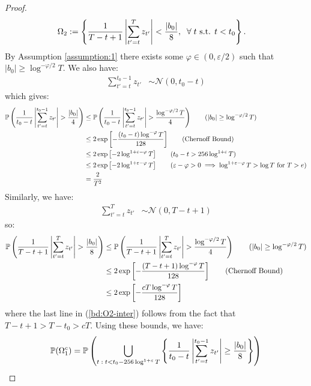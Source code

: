 \begin{proof}
\begin{align*}
    \Omega_2 &:= \left\{\frac{1}{T-t+1}\left|\sum_{t'=t}^T z_{t'}\right| < \frac{|b_0|}{8}, \; \;\forall\; t \text{ s.t. } t < t_0 \right\}.
\end{align*}
By Assumption \ref{assumption:1} there exists some $\varphi \in (0,\varepsilon/2)$ such that $|b_0| \geq \log^{-\varphi/2}T$. We also have:
\begin{align*}
    \sum_{t'=t}^{t_0-1} z_{t'} &\sim \mathcal{N}(0, t_0 - t) 
\end{align*}
which gives:
\begin{align}
    \mathbb{P}\left(\frac{1}{t_0-t}\left|\sum_{t'=t}^{t_0-1} z_{t'}\right| > \frac{|b_0|}{4}\right) &\leq \mathbb{P}\left(\frac{1}{t_0-t}\left|\sum_{t'=t}^{t_0-1} z_{t'}\right| > \frac{\log^{-\varphi/2}T}{4}\right) \tag{$|b_0| \geq \log^{-\varphi/2}T$} \\
    &\leq 2 \exp\left[- \frac{(t_0-t)\log^{-\varphi}T}{128}\right] \tag{Chernoff Bound}\\
    &\leq 2 \exp\left[- 2\log^{1+\varepsilon-\varphi}T\right] \tag{$t_0 - t > 256\log^{1+\varepsilon} T$} \\
    &\leq 2 \exp\left[- 2\log^{1+\varepsilon-\varphi}T\right] \tag{$\varepsilon-\varphi > 0 \implies \log^{1+\varepsilon-\varphi}T > \log T$ for $T > e$}\\ 
    &= \frac{2}{T^2} \label{bd:O1-inter} 
\end{align}
Similarly, we have:
\begin{align*}
    \sum_{t'=t}^{T} z_{t'} &\sim \mathcal{N}(0, T - t + 1)
\end{align*}
so:
\begin{align}
    \mathbb{P}\left(\frac{1}{T-t+1}\left|\sum_{t'=t}^T z_{t'}\right| > \frac{ |b_0|}{8}\right) &\leq \mathbb{P}\left(\frac{1}{T-t+1}\left|\sum_{t'=t}^T z_{t'}\right| > \frac{\log^{-\varphi/2}T}{4}\right) \tag{$|b_0| \geq \log^{-\varphi/2}T$} \\
    &\leq 2 \exp\left[- \frac{(T-t + 1)\log^{-\varphi}T}{128}\right] \tag{Chernoff Bound}\\
    &\leq 2 \exp\left[- \frac{cT\log^{-\varphi}T}{128}\right] \label{bd:O2-inter} 
\end{align}
where the last line in (\ref{bd:O2-inter}) follows from the fact that $T-t+1> T-t_0 > cT$. Using these bounds, we have:
\begin{align}
    \mathbb{P}(\Omega^c_1) &= \mathbb{P}\left(\bigcup_{ t \;:\; t < t_0 - 256 \log^{1+\varepsilon}T} \left\{
    \frac{1}{t_0-t}\left|\sum_{t'=t}^{t_0-1} z_{t'}\right| \geq \frac{|b_0|}{8}\right\} \right) \notag \\

\end{align}
\end{proof}
